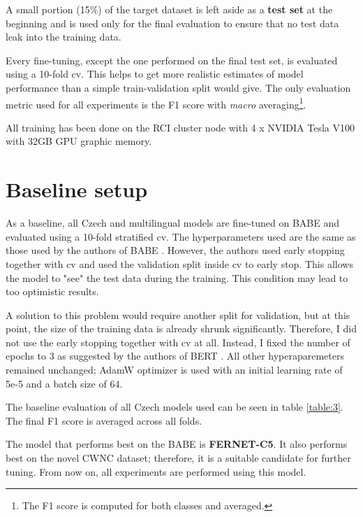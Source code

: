 A small portion (15\%) of the target dataset is left aside as a \textbf{test set} at the beginning and is used only for the final evaluation to ensure that no test data leak into the training data.

Every fine-tuning, except the one performed on the final test set, is evaluated using a 10-fold \gls{cv}. This helps to get more realistic estimates of model performance than a simple train-validation split would give. The only evaluation metric used for all experiments is the F1 score with \textit{macro} averaging\footnote{The F1 score is computed for both classes and averaged.}. 

All training has been done on the RCI cluster node with 4 x NVIDIA Tesla V100 with 32GB GPU graphic memory.





 \section{Baseline setup}
 As a baseline, all Czech and multilingual models are fine-tuned on BABE and evaluated using a 10-fold stratified \gls{cv}. The hyperparameters used are the same as those used by the authors of BABE \cite{Spinde2021MBIC}. However, the authors used early stopping together with \gls{cv} and used the validation split inside \gls{cv} to early stop. This allows the model to "see" the test data during the training. This condition may lead to too optimistic results.
 
 A solution to this problem would require another split for validation, but at this point, the size of the training data is already shrunk significantly. Therefore, I did not use the early stopping together with \gls{cv} at all. Instead, I fixed the number of epochs to 3 as suggested by the authors of BERT \cite{devlin2019bert} . 
 All other hyperaparemeters remained unchanged; AdamW optimizer is used with an initial learning rate of 5e-5 and a batch size of 64.
 
 The baseline evaluation of all Czech models used can be seen in table \ref{table:3}. The final F1 score is averaged across all folds.
 
 The model that performs best on the BABE is \textbf{FERNET-C5}. It also performs best on the novel CWNC dataset; therefore, it is a suitable candidate for further tuning. From now on, all experiments are performed using this model.
 

 

